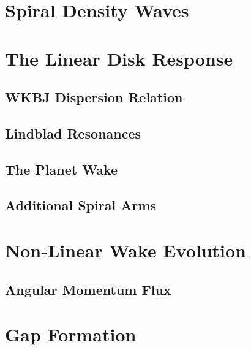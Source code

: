 \section{Spiral Density Waves}

\section{The Linear Disk Response}

\subsection{WKBJ Dispersion Relation}

\subsection{Lindblad Resonances}

\subsection{The Planet Wake}

\subsection{Additional Spiral Arms}

\section{Non-Linear Wake Evolution}

\subsection{Angular Momentum Flux}

\section{Gap Formation}